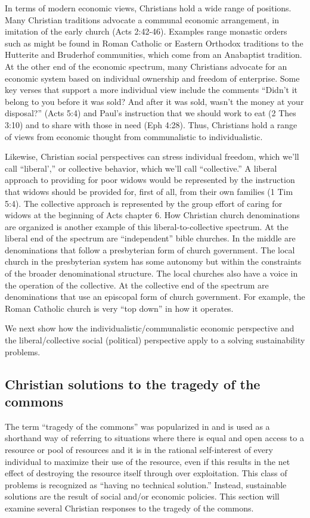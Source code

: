 \documentclass[12pt]{article}
\begin{document}
In terms of modern economic views, Christians hold a wide range of positions. Many Christian traditions advocate a
communal economic arrangement, in imitation of the early church (Acts 2:42-46). Examples range monastic orders such as
might be found in Roman Catholic or Eastern Orthodox traditions to the Hutterite and Bruderhof communities, which come
from an Anabaptist tradition. At the other end of the economic spectrum, many Christians advocate for an economic system
based on individual ownership and freedom of enterprise. Some key verses that support a more individual view include the
comments ``Didn’t it belong to you before it was sold? And after it was sold, wasn’t the money at your disposal?'' (Acts
5:4) and Paul's instruction that we should work to eat (2 Thes 3:10) and to share with those in need (Eph 4:28).
Thus, Christians hold a range of views from economic thought from communalistic to individualistic.

Likewise, Christian social perspectives can stress individual freedom, which we'll call ``liberal','' or collective behavior, which
we'll call ``collective.'' A liberal approach to providing for poor widows would be represented by the instruction that widows should be 
provided for, first of all, from their own families (1 Tim 5:4). 
The collective approach is represented by the group effort of caring for widows at the beginning of Acts chapter 6.
How Christian church denominations are organized is another example of this liberal-to-collective spectrum.
At the liberal end of the spectrum are ``independent'' bible churches. In the middle are denominations that follow a presbyterian form of church 
government. The local church in the presbyterian system has some autonomy but within the constraints of the broader 
denominational structure. The local churches also have a voice in the operation of the collective. At the collective end of the spectrum 
are denominations that use an episcopal form of church government. For example, the Roman Catholic church is very ``top down'' 
in how it operates.

We next show how the individualistic/communalistic economic perspective and the liberal/collective social (political) perspective
apply to a solving sustainability problems.

\subsection{Christian solutions to the tragedy of the commons}
\label{sec:totc}
The term ``tragedy of the commons'' was popularized in \cite{Hardin68} and is used as a shorthand way of referring to
situations where there is equal and open access to a resource or pool of resources and it is in the rational self-interest of
every individual to maximize their use of the resource, even if this results in the net effect of destroying the
resource itself through over exploitation. This class of problems is recognized as ``having no technical solution.''
Instead, sustainable solutions are the result of social and/or economic policies. This section will examine several
Christian responses to the tragedy of the commons.
\end{document}
